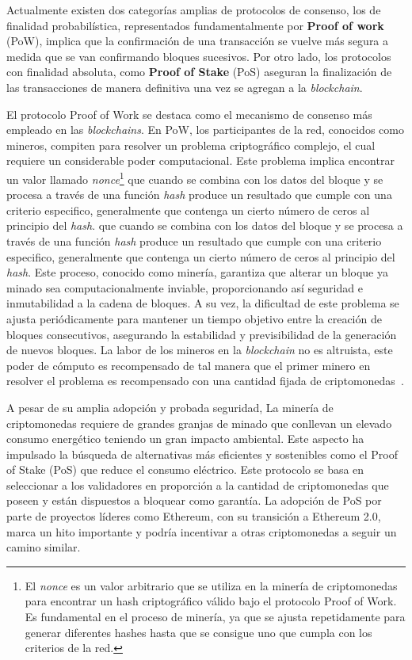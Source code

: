 Actualmente existen dos categorías amplias de protocolos de consenso, los de finalidad probabilística, representados fundamentalmente por \textbf{Proof of work} (PoW), implica que la confirmación de una transacción se vuelve más segura a medida que se van confirmando bloques sucesivos.
Por otro lado, los protocolos con finalidad absoluta, como \textbf{Proof of Stake} (PoS) aseguran la finalización de las transacciones de manera definitiva una vez se agregan a la \textit{blockchain}.

El protocolo Proof of Work se destaca como el mecanismo de consenso más empleado en las \textit{blockchains}. En PoW, los participantes de la red, conocidos como mineros, compiten para resolver un problema criptográfico complejo, el cual requiere un considerable poder computacional. Este problema implica encontrar un valor llamado \textit{nonce}\footnote{El \textit{nonce} es un valor arbitrario que se utiliza en la minería de criptomonedas para encontrar un hash criptográfico válido bajo el protocolo Proof of Work. Es fundamental en el proceso de minería, ya que se ajusta repetidamente para generar diferentes hashes hasta que se consigue uno que cumpla con los criterios de la red.} que cuando se combina con los datos del bloque y se procesa a través de una función \textit{hash} produce un resultado que cumple con una criterio especifico, generalmente que contenga un cierto número de ceros al principio del \textit{hash}. que cuando se combina con los datos del bloque y se procesa a través de una función \textit{hash} produce un resultado que cumple con una criterio especifico, generalmente que contenga un cierto número de ceros al principio del \textit{hash}.
Este proceso, conocido como minería, garantiza que alterar un bloque ya minado sea computacionalmente inviable, proporcionando así seguridad e inmutabilidad a la cadena de bloques. A su vez, la dificultad de este problema se ajusta periódicamente para mantener un tiempo objetivo entre la creación de bloques consecutivos, asegurando la estabilidad y previsibilidad de la generación de nuevos bloques.
La labor de los mineros en la \textit{blockchain} no es altruista, este poder de cómputo es recompensado de tal manera que el primer minero en resolver el problema es recompensado con una cantidad fijada de criptomonedas~\cite{PoW}.

A pesar de su amplia adopción y probada seguridad, La minería de criptomonedas requiere de grandes granjas de minado que conllevan un elevado consumo energético teniendo un gran impacto ambiental. 
Este aspecto ha impulsado la búsqueda de alternativas más eficientes y sostenibles como el Proof of Stake (PoS) que reduce el consumo eléctrico. Este protocolo se basa en seleccionar a los validadores en proporción a la cantidad de criptomonedas que poseen y están dispuestos a bloquear como garantía.
La adopción de PoS por parte de proyectos líderes como Ethereum, con su transición a Ethereum 2.0, marca un hito importante y podría incentivar a otras criptomonedas a seguir un camino similar.

